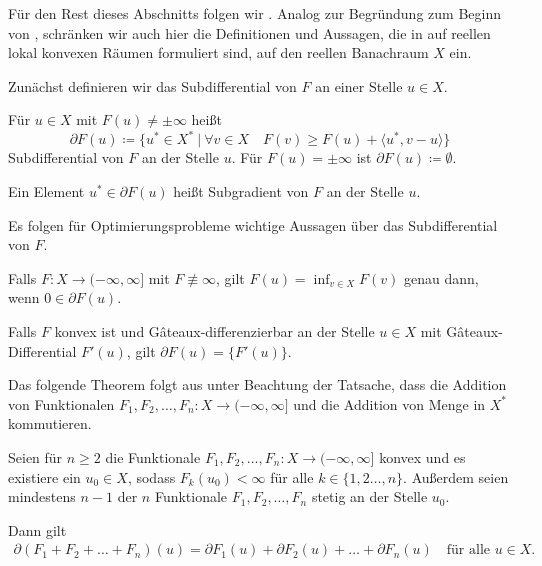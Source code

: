 Für den Rest dieses Abschnitts folgen wir \cite[S. 385-397]{Zei85}. 
Analog zur Begründung zum Beginn von , schränken
wir auch hier die Definitionen und Aussagen, die in \cite{Zei85} auf reellen
lokal konvexen Räumen formuliert sind, auf den reellen Banachraum $X$ ein.

Zunächst definieren wir das Subdifferential von $F$ an einer Stelle $u\in X$.

\begin{definition}[Subdifferential]
  \label{def:subdifferential}
  Für $u\in X$ mit $F(u)\neq\pm\infty$ heißt
  \begin{equation}
    \label{eq:subdifferential}
    \partial F(u)\coloneqq
    \{u^\ast\in X^\ast\ |\ 
    \forall v\in X\quad F(v)\geq F(u)+\langle u^\ast,v-u\rangle\}  
  \end{equation}
  Subdifferential von $F$ an der Stelle $u$. Für $F(u)=\pm\infty$ ist
  $\partial F(u)\coloneq\emptyset$.

  Ein Element $u^\ast\in\partial F(u)$ heißt Subgradient von $F$ an der Stelle
  $u$.
\end{definition}

Es folgen für Optimierungsprobleme wichtige Aussagen über das Subdifferential 
von $F$.

\begin{theorem}
  \label{thm:extremalprinciple}
  Falls $F: X\to (-\infty,\infty]$ mit $F\nequiv\infty$, gilt
  $F(u)=\inf_{v\in X}F(v)$ genau dann, wenn $0\in\partial F(u)$.
\end{theorem}

\begin{theorem}
  \label{thm:subdiffGateaux}
  Falls $F$ konvex ist und G\^{a}teaux-differenzierbar
  an der Stelle $u\in X$ mit G\^{a}teaux-Differential $F'(u)$,
  gilt $\partial F(u)=\{F'(u)\}$.
\end{theorem}

Das folgende Theorem folgt aus \cite[S. 389, Theorem 47.B]{Zei85} unter 
Beachtung der Tatsache, dass die Addition von Funktionalen 
$F_1,F_2,\ldots,F_n:X\to (-\infty,\infty]$ und die Addition von
Menge in $X^\ast$ kommutieren.

\begin{theorem}
  \label{thm:subdifferentialSumRule}
  Seien für $n\geq 2$ die Funktionale $F_1,F_2,\ldots,F_n: X\to
  (-\infty,\infty]$ konvex und es existiere
  ein $u_0\in X$, sodass $F_k(u_0)<\infty$
  für alle $k\in\{1,2\ldots,n\}$. 
  Außerdem seien mindestens $n-1$ der $n$ Funktionale $F_1,F_2,\ldots,F_n$
  stetig an der Stelle $u_0$.

  Dann gilt 
  \begin{align*}
    \partial (F_1+F_2+\ldots+ F_n)(u) 
    = \partial F_1(u)+\partial F_2(u)+ \ldots + \partial F_n(u) \quad\text{für
    alle } u\in X.
  \end{align*}
\end{theorem}

